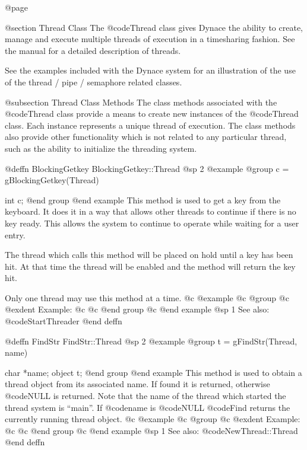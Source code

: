 @page

@section Thread Class
The @code{Thread} class gives Dynace the ability to create, manage and
execute multiple threads of execution in a timesharing fashion.  See the
manual for a detailed description of threads.


See the examples included with the Dynace system for an illustration of the
use of the thread / pipe / semaphore related classes.


@subsection Thread Class Methods
The class methods associated with the @code{Thread} class provide a means
to create new instances of the @code{Thread} class.  Each instance
represents a unique thread of execution.  The class methods also provide
other functionality which is not related to any particular thread, such
as the ability to initialize the threading system.










@deffn {BlockingGetkey} BlockingGetkey::Thread
@sp 2
@example
@group
c = gBlockingGetkey(Thread)

int     c;
@end group
@end example
This method is used to get a key from the keyboard.  It does it in a way
that allows other threads to continue if there is no key ready.  This
allows the system to continue to operate while waiting for a user entry.

The thread which calls this method will be placed on hold until a key
has been hit.  At that time the thread will be enabled and the method
will return the key hit.

Only one thread may use this method at a time.
@c @example
@c @group
@c @exdent Example:
@c 
@c @end group
@c @end example
@sp 1
See also:  @code{StartThreader}
@end deffn











@deffn {FindStr} FindStr::Thread
@sp 2
@example
@group
t = gFindStr(Thread, name)

char    *name;
object  t;
@end group
@end example
This method is used to obtain a thread object from its associated name.
If found it is returned, otherwise @code{NULL} is returned.  Note
that the name of the thread which started the thread system is ``main''.
If @code{name} is @code{NULL} @code{Find} returns the currently running
thread object.
@c @example
@c @group
@c @exdent Example:
@c 
@c @end group
@c @end example
@sp 1
See also:  @code{NewThread::Thread}
@end deffn









